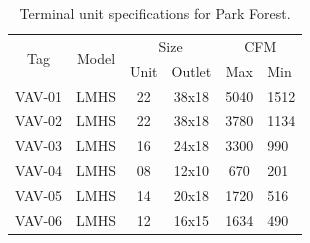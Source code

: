\begin{table}
    \centering
    \caption{Terminal unit specifications for Park Forest.}
    \label{tab:ParkForestTerminalUnitSpecs}
    \begin{tabular}{@{}cccccl@{}}
        \toprule
        \multirow{2}{*}{Tag} & \multirow{2}{*}{Model} & \multicolumn{2}{c}{Size} & \multicolumn{2}{c}{CFM} \\
                             &                        & Unit       & Outlet      & Max        & Min        \\ \midrule
        VAV-01               & LMHS                   & 22         & 38x18       &  \num{5040}      &  \num{1512}      \\
        VAV-02               & LMHS                   & 22         & 38x18       &  \num{3780}      &  \num{1134}      \\
        VAV-03               & LMHS                   & 16         & 24x18       &  \num{3300}      &  \num{990}       \\
        VAV-04               & LMHS                   & 08         & 12x10       &  \num{670}       &  \num{201}       \\
        VAV-05               & LMHS                   & 14         & 20x18       &  \num{1720}      &  \num{516}       \\
        VAV-06               & LMHS                   & 12         & 16x15       &  \num{1634}      &  \num{490}       \\ \bottomrule
    \end{tabular}
\end{table}





